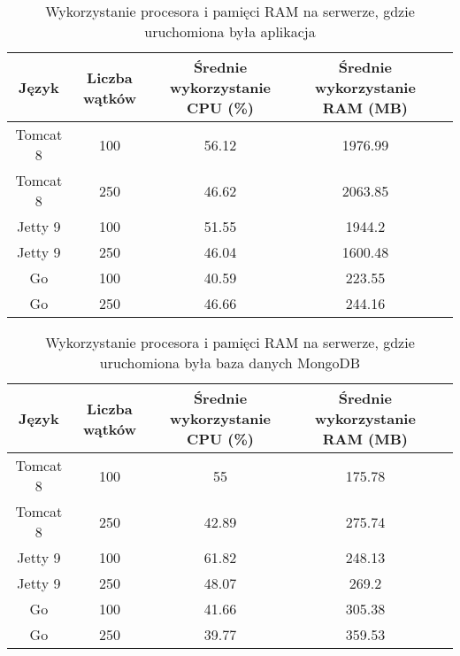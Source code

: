 
\begin{table}[!htb]
\centering
\caption{Wykorzystanie procesora i pamięci RAM na serwerze, gdzie uruchomiona była aplikacja}
\label{tab:app-clean-all}
\begin{tabular}{@{}ccccl@{}}
\toprule
\textbf{Język} & \textbf{Liczba wątków} & \multicolumn{1}{p{3cm}}{\textbf{Średnie wykorzystanie CPU (\%)}} & \multicolumn{1}{p{3cm}}{\textbf{Średnie wykorzystanie RAM (MB)}} &  \\ \midrule
Tomcat 8       & 100                    & 56.12                             & 1976.99                          &  \\
Tomcat 8       & 250                    & 46.62                             & 2063.85                          &  \\
Jetty 9       & 100                    & 51.55                             & 1944.2                          &  \\
Jetty 9       & 250                    & 46.04                             & 1600.48                          &  \\
Go       & 100                    & 40.59                             & 223.55                          &  \\
Go       & 250                    & 46.66                             & 244.16                          &  \\
\bottomrule
\end{tabular}
\end{table}


\begin{table}[!htb]
\centering
\caption{Wykorzystanie procesora i pamięci RAM na serwerze, gdzie uruchomiona była baza danych MongoDB}
\label{tab:mongo-clean-all}
\begin{tabular}{@{}ccccl@{}}
\toprule
\textbf{Język} & \textbf{Liczba wątków} & \multicolumn{1}{p{3cm}}{\textbf{Średnie wykorzystanie CPU (\%)}} & \multicolumn{1}{p{3cm}}{\textbf{Średnie wykorzystanie RAM (MB)}} &  \\ \midrule
Tomcat 8       & 100                    & 55                             & 175.78                          &  \\
Tomcat 8       & 250                    & 42.89                             & 275.74                          &  \\
Jetty 9       & 100                    & 61.82                             & 248.13                          &  \\
Jetty 9       & 250                    & 48.07                             & 269.2                          &  \\
Go       & 100                    & 41.66                             & 305.38                          &  \\
Go       & 250                    & 39.77                             & 359.53                          &  \\
\bottomrule
\end{tabular}
\end{table}


